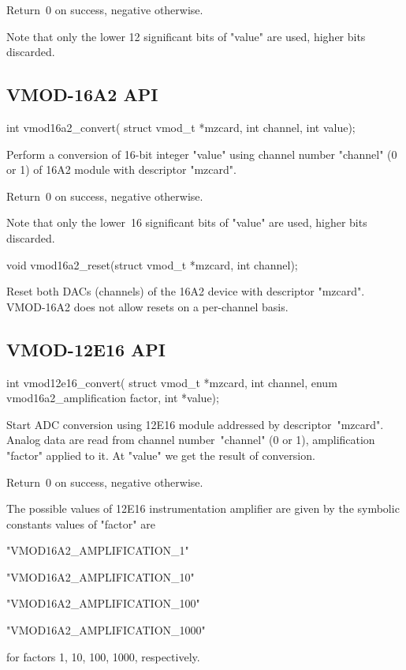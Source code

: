 \documentclass[11pt,a4paper]{article}
\begin{document}
Return~0 on success, negative otherwise.

Note that only the lower 12 significant bits of "value" are
used, higher bits discarded.

\subsection{VMOD-16A2 API}

\begin{proto}
int vmod16a2_convert(
	struct vmod_t *mzcard, int channel,
	int value);
\end{proto}


Perform a conversion of 16-bit integer "value" using channel 
number "channel" (0 or 1) of 16A2 module with descriptor "mzcard". 

Return~0 on success, negative otherwise.

Note that only the lower~16 significant bits of "value" are
used, higher bits discarded.

\begin{proto}
void vmod16a2_reset(struct vmod_t *mzcard, int channel);
\end{proto}

Reset both DACs (channels) of the 16A2 device with descriptor "mzcard".
VMOD-16A2 does not allow resets on a per-channel basis.

\subsection{VMOD-12E16 API}

\begin{proto}
int vmod12e16_convert(
	struct vmod_t *mzcard, int channel,
	enum vmod16a2_amplification factor, int *value);
\end{proto}

Start ADC conversion using 12E16 module addressed by descriptor~"mzcard".
Analog data are read from channel number~"channel" (0 or 1), amplification
"factor" applied to it. At "value" we get the result of
conversion.

Return~0 on success, negative otherwise.

The possible values of 12E16 instrumentation amplifier are given
by the symbolic constants values of "factor" are
\begin{compactitem}
    \item "VMOD16A2_AMPLIFICATION_1"
    \item "VMOD16A2_AMPLIFICATION_10"
    \item "VMOD16A2_AMPLIFICATION_100"
    \item "VMOD16A2_AMPLIFICATION_1000"
\end{compactitem}
for factors 1, 10, 100, 1000, respectively.
\end{document}
